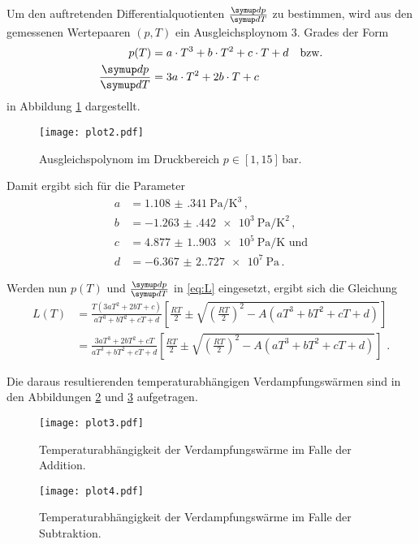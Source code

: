 Um den auftretenden Differentialquotienten $\frac{\dif{p}}{\dif{T}}$ zu bestimmen,
wird aus den gemessenen Wertepaaren $(p,T)$ ein Ausgleichsploynom 3. Grades der Form
\begin{align*}
    p(T) &= a \cdot T^{3} + b \cdot T^{2} + c \cdot T+d \quad \text{bzw.} \\
    \frac{\dif{p}}{\dif{T}} &= 3a \cdot T^{2} + 2b \cdot T + c \quad 
\end{align*}
in Abbildung \ref{fig:plot2} dargestellt.
\begin{figure}[H]
    \centering
    \texttt{[image: plot2.pdf]}
    \caption{Ausgleichspolynom im Druckbereich $p \in [1, 15] \, \mathrm{bar}$.}
    \label{fig:plot2}
\end{figure}

Damit ergibt sich für die Parameter
\begin{align*}
    a &= \qty{1.108(341)}{\pascal\per\cubic\kelvin} \, , \\
    b &= \qty{-1.263(442)e3}{\pascal\per\kelvin\squared} \, , \\ %
    c &= \qty{4.877(1.903)e5}{\pascal\per\kelvin} \, \, \text{und} \\ %
    d &= \qty{-6.367(2.727)e7}{\pascal} \, . %
\end{align*}

Werden nun $p(T)$ und $\frac{\dif{p}}{\dif{T}}$ in \ref{eq:L} eingesetzt, 
ergibt sich die Gleichung 
\begin{align}
    L(T) &= \frac{T \left(3 a T^{2}+2 b T+c\right)}{a T^{3}+b T^{2}+c T+d} \left[\frac{R T}{2} \pm \sqrt{\left(\frac{R T}{2}\right)^{2}-A \left(a T^{3}+b T^{2}+c T+d\right)}\right]  \\
    &= \frac{3 a T^{3}+2 b T^{2}+c T}{a T^{3}+b T^{2}+c T+d} \left[\frac{R T}{2} \pm \sqrt{\left(\frac{R T}{2}\right)^{2}-A\left(a T^{3}+b T^{2}+c T+d\right)}\right] \text{ .}
\end{align}

Die daraus resultierenden temperaturabhängigen Verdampfungswärmen sind in den Abbildungen
\ref{fig:plot3} und \ref{fig:plot4} aufgetragen.

\begin{figure}[H]
    \centering
    \texttt{[image: plot3.pdf]}
    \caption{Temperaturabhängigkeit der Verdampfungswärme im Falle der Addition.}
    \label{fig:plot3}
\end{figure}

\begin{figure}[H]
    \centering
    \texttt{[image: plot4.pdf]}
    \caption{Temperaturabhängigkeit der Verdampfungswärme im Falle der Subtraktion.}
    \label{fig:plot4}
\end{figure}